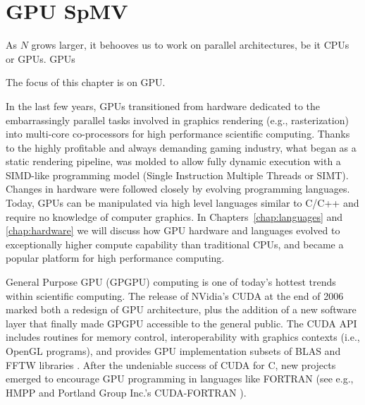 \documentclass{report}
\begin{document}
\fi

\chapter{GPU SpMV}
\label{chap:gpu_rbffd}

As $N$ grows larger, it behooves us to work on parallel architectures, be it CPUs or GPUs. GPUs 


 

The focus of this chapter is on GPU. 


In the last few years, GPUs transitioned from hardware dedicated to the embarrassingly parallel tasks involved in graphics rendering (e.g., 
rasterization) into multi-core co-processors for high performance scientific computing.  Thanks to the highly profitable and always demanding gaming industry, what began as a static rendering pipeline, was molded to allow fully dynamic execution with a SIMD-like programming model (Single Instruction Multiple Threads or SIMT). Changes in hardware were 
followed closely by evolving programming languages. Today, GPUs can be manipulated via high level 
languages 
similar to C/C++ and require no knowledge of computer graphics. 
In Chapters~\ref{chap:languages} and \ref{chap:hardware} we will discuss 
how GPU hardware and languages evolved to exceptionally higher compute capability than traditional CPUs, and became a popular platform for high performance computing.



General Purpose GPU (GPGPU) computing is one of today's hottest trends within scientific computing. 
The release of NVidia's CUDA at the end of 2006 marked both a 
redesign of GPU architecture, plus the addition of a new software layer that finally made GPGPU accessible to the general public. The CUDA API includes routines for memory control, interoperability with graphics contexts (i.e., 
OpenGL programs), and provides GPU implementation subsets of BLAS and FFTW libraries \cite{CudaGuide2011}. After the undeniable success of CUDA for C, new projects emerged to encourage GPU programming in languages like FORTRAN (see e.g., HMPP \cite{HMPP2009} and Portland Group Inc.'s CUDA-FORTRAN \cite{CudaFortran2009}). 
\end{document}
